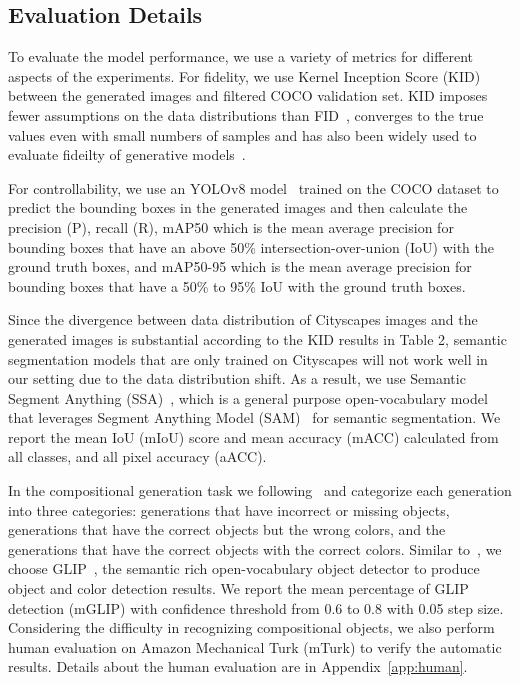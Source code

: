 \subsection{Evaluation Details}
To evaluate the model performance, we use a variety of metrics for different aspects of the experiments. For fidelity, we use Kernel Inception Score (KID)~\citep{kid} between the generated images and filtered COCO validation set.
KID imposes fewer assumptions on the data distributions than FID~\citep{fid}, converges to the true values even with small numbers of samples and has also been widely used to evaluate fideilty of generative models~\citep{sdedit}.

For controllability, we use an YOLOv8 model~\cite{yolo} trained on the COCO dataset to predict the bounding boxes in the generated images and then calculate the precision (P), recall (R), mAP50
which is the mean average precision for bounding boxes that have an above 50\% intersection-over-union (IoU) with the ground truth boxes, 
and mAP50-95 
which is the mean average precision for bounding boxes that have a 50\% to 95\% IoU 
with the ground truth boxes.

Since the divergence between data distribution of Cityscapes images and the generated images is substantial according to the KID results in Table 2, semantic segmentation models that are only trained on Cityscapes will not work well in our setting due to the data distribution shift. As a result, we use Semantic Segment Anything (SSA)~\citep{ssa}, which is a general purpose open-vocabulary model that leverages Segment Anything Model (SAM)~\citep{sam} for semantic segmentation. We report the mean IoU (mIoU) score and mean accuracy (mACC) calculated from all classes, and all pixel accuracy (aACC).

In the compositional generation task we following~\citet{structurediffusion} and categorize each generation into three categories: generations that have incorrect or missing objects, generations that have the correct objects but the wrong colors, and the generations that have the correct objects with the correct colors. Similar to~\citet{gligen,structurediffusion}, we choose GLIP~\citep{glip}, the semantic rich open-vocabulary object detector to produce object and color detection results. We report the mean percentage of GLIP detection (mGLIP) with confidence threshold from 0.6 to 0.8 with 0.05 step size. Considering the difficulty in recognizing compositional objects, we also perform human evaluation on Amazon Mechanical Turk (mTurk) to verify the automatic results. Details about the human evaluation are in Appendix~\ref{app:human}.

